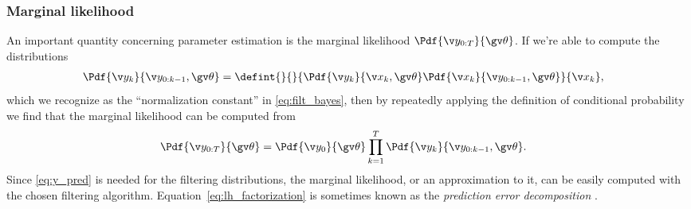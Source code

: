 \subsubsection*{Marginal likelihood}

An important quantity concerning parameter estimation is the marginal likelihood $\Pdf{\Y}{\Th}$. 
If we're able to compute the distributions
\begin{align}
	\Pdf{\y_k}{\y_{0:k-1},\Th}&=\defint{}{}{\Pdf{\yk}{\xk,\Th}\Pdf{\xk}{\y_{0:k-1},\Th}}{\xk},
	\label{eq:y_pred}
\end{align}
which we recognize as the ``normalization constant'' in \eqref{eq:filt_bayes},
then by repeatedly applying the definition of conditional probability 
we find that the marginal likelihood can be computed from
\begin{align}
	\Pdf{\Y}{\Th}&=\Pdf{\y_0}{\Th}\prod_{k=1}^T \Pdf{\y_k}{\y_{0:k-1},\Th}.
	\label{eq:lh_factorization}
\end{align}
Since \eqref{eq:y_pred} is needed for the filtering distributions, the marginal likelihood, or an approximation to it, can be easily
computed with the chosen filtering algorithm. Equation~\eqref{eq:lh_factorization} is sometimes known 
as the \emph{prediction error decomposition} \parencite{Harvey1990}.




